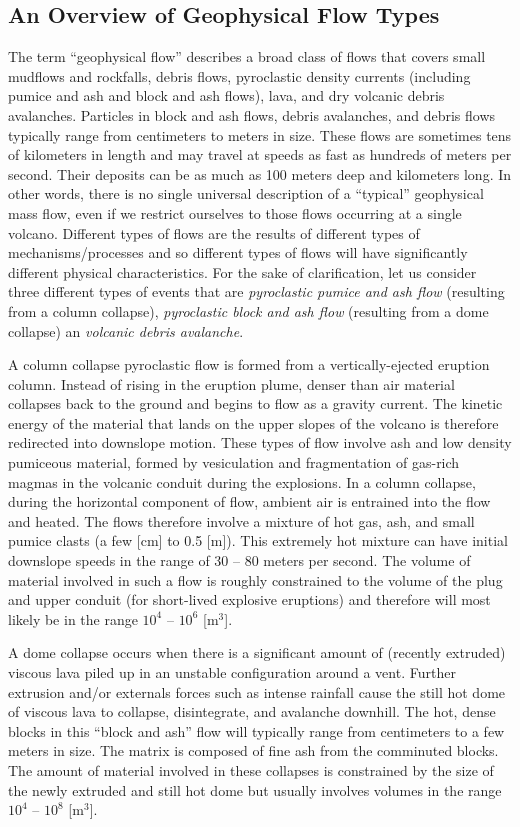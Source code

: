 \documentclass{article}
\begin{document}
\subsection{An Overview of Geophysical Flow Types}\label{subsec:FlowTypes}
The term ``geophysical flow'' describes a broad class of flows that covers small mudflows and rockfalls, debris flows, pyroclastic density currents (including pumice and ash and block and ash flows), lava, and dry volcanic debris avalanches. Particles in block and ash flows, debris avalanches, and debris flows typically range from centimeters to meters in size. These flows are sometimes tens of kilometers in length and may travel at speeds as fast as hundreds of meters per second. Their deposits can be as much as 100 meters deep and kilometers long. In other words, there is no single universal description of a ``typical'' geophysical mass flow, even if we restrict ourselves to those flows occurring at a single volcano. Different types of flows are the results of different types of mechanisms/processes and so different types of flows will have significantly different physical characteristics. For the sake of clarification, let us consider three different types of events that are \textit{pyroclastic pumice and ash flow} (resulting from a column collapse), \textit{pyroclastic block and ash flow} (resulting from a dome collapse) an \textit{volcanic debris avalanche}.

A column collapse pyroclastic flow is formed from a vertically-ejected eruption column. Instead of rising in the eruption plume, denser than air material collapses back to the ground and begins to flow as a gravity current. The kinetic energy of the material that lands on the upper slopes of the volcano is therefore redirected into downslope motion. These types of flow involve ash and low density pumiceous material, formed by vesiculation and fragmentation of gas-rich magmas in the volcanic conduit during the explosions. In a column collapse, during the horizontal component of flow, ambient air is entrained into the flow and heated. The flows therefore involve a mixture of hot gas, ash, and small pumice clasts (a few [cm] to 0.5 [m]). This extremely hot mixture can have initial downslope speeds in the range of 30 -- 80 meters per second. The volume of material involved in such a flow is roughly constrained to the volume of the plug and upper conduit (for short-lived explosive eruptions) and therefore will most likely be in the range $10^4$ -- $10^6$ [$\mathrm{m^3}$].

A dome collapse occurs when there is a significant amount of (recently extruded) viscous lava piled up in an unstable configuration around a vent. Further extrusion and/or externals forces such as intense rainfall cause the still hot dome of viscous lava to collapse, disintegrate, and avalanche downhill. The hot, dense blocks in this ``block and ash'' flow will typically range from centimeters to a few meters in size. The matrix is composed of fine ash from the comminuted blocks. The amount of material involved in these collapses is constrained by the size of the newly extruded and still hot dome but usually involves volumes in the range $10^4$ -- $10^8$ [$\mathrm{m^3}$].
\end{document}
